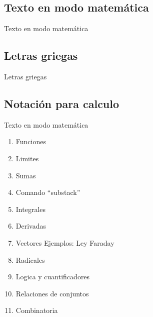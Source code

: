 \documentclass[../slides.tex]{subfiles}
\begin{document}
    \subsection{Texto en modo matemática}
    
    \begin{frame}{Texto en modo matemática}
    \end{frame}        
    
    \subsection{Letras griegas}

    \begin{frame}{Letras griegas}
    \end{frame} 
    
    \subsection{Notación para calculo}

    \begin{frame}{Texto en modo matemática}
    \end{frame}
        \begin{enumerate}
        \item{Funciones}
        \item{Limites}
        \item{Sumas}
            \item{Comando ``substack''}
        \item{Integrales}
        \item{Derivadas}
        \item{Vectores}
            Ejemplos: Ley Faraday
    
        \item{Radicales}
        
        \item{Logica y cuantificadores}
        
        \item{Relaciones de conjuntos}
        
        \item{Combinatoria} 
        \end{enumerate}
\end{document}
